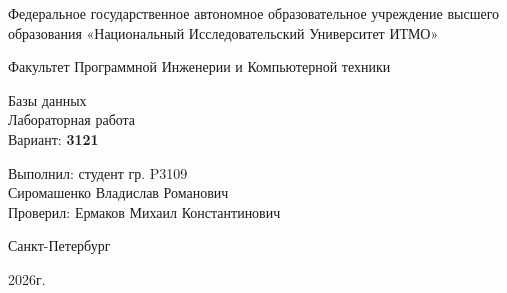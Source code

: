 \begin{center}
	Федеральное государственное автономное образовательное учреждение высшего образования «Национальный Исследовательский Университет ИТМО»
	
	\vspace{1em}
	Факультет Программной Инженерии и Компьютерной техники
	
	\vspace{20em}
	
	{\Large Базы данных}\\[1em]
	{\Large Лабораторная работа }\\[1em]
	Вариант: \textbf{3121}
\end{center}

\vspace{12em}

\begin{flushright}
	Выполнил:
	студент гр. P3109\\
	Сиромашенко Владислав Романович\\
	Проверил:
	Ермаков Михаил Константинович
\end{flushright}
\vspace{9em}
\vspace{\fill}

\begin{center}
	Санкт-Петербург
	
	2026г.
\end{center}